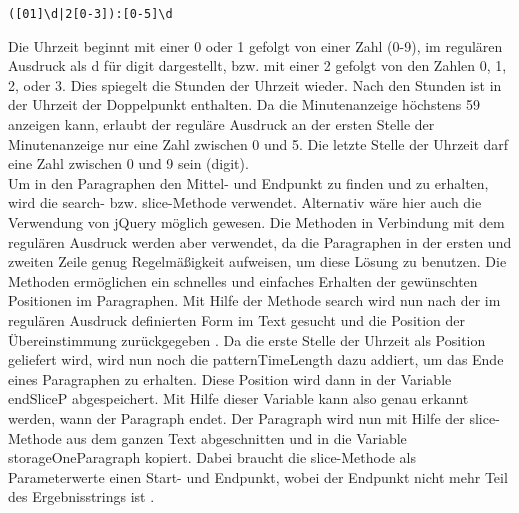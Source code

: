 \begin{verbatim}
([01]\d|2[0-3]):[0-5]\d
\end{verbatim}
Die Uhrzeit beginnt mit einer 0 oder 1 gefolgt von einer Zahl (0-9), im regulären Ausdruck als d für digit dargestellt, bzw. mit einer 2 gefolgt von den Zahlen 0, 1, 2, oder 3. Dies spiegelt die Stunden der Uhrzeit wieder. Nach den Stunden ist in der Uhrzeit der Doppelpunkt enthalten. Da die Minutenanzeige höchstens 59 anzeigen kann, erlaubt der reguläre Ausdruck an der ersten Stelle der Minutenanzeige nur eine Zahl zwischen 0 und 5. Die letzte Stelle der Uhrzeit darf eine Zahl zwischen 0 und 9 sein (digit). \\
Um in den Paragraphen den Mittel- und Endpunkt zu finden und zu erhalten, wird die search- bzw. slice-Methode verwendet. Alternativ wäre hier auch die Verwendung von jQuery möglich gewesen. Die Methoden in Verbindung mit dem regulären Ausdruck werden aber verwendet, da die Paragraphen in der ersten und zweiten Zeile genug Regelmäßigkeit aufweisen, um diese Lösung zu benutzen. Die Methoden ermöglichen ein schnelles und einfaches Erhalten der gewünschten Positionen im Paragraphen.
Mit Hilfe der Methode search wird nun nach der im regulären Ausdruck definierten Form im Text gesucht und die Position der Übereinstimmung zurückgegeben \cite{search}. Da die erste Stelle der Uhrzeit als Position geliefert wird, wird nun noch die patternTimeLength dazu addiert, um das Ende eines Paragraphen zu erhalten. Diese Position wird dann in der Variable endSliceP abgespeichert. Mit Hilfe dieser Variable kann also genau erkannt werden, wann der Paragraph endet. Der Paragraph wird nun mit Hilfe der slice-Methode aus dem ganzen Text abgeschnitten und in die Variable storageOneParagraph kopiert. Dabei braucht die slice-Methode als Parameterwerte einen Start- und Endpunkt, wobei der Endpunkt nicht mehr Teil des Ergebnisstrings ist \cite{slice}. 

